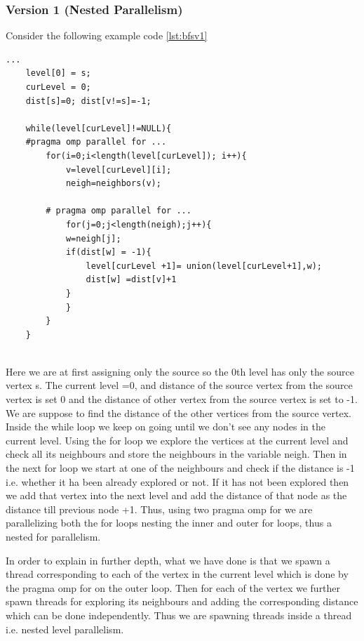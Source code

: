 \documentclass[12pt]{article}
\begin{document}
\subsubsection{Version 1 (Nested Parallelism)}
Consider the following example code \ref{lst:bfsv1}
\begin{lstlisting}[caption={BFS-Example},captionpos=b,label={lst:bfsv1}]
...
    level[0] = s;
    curLevel = 0;
    dist[s]=0; dist[v!=s]=-1;

    while(level[curLevel]!=NULL){
    #pragma omp parallel for ...
        for(i=0;i<length(level[curLevel]); i++){
            v=level[curLevel][i];
            neigh=neighbors(v);

        # pragma omp parallel for ...
            for(j=0;j<length(neigh);j++){
            w=neigh[j];
            if(dist[w] = -1){
                level[curLevel +1]= union(level[curLevel+1],w);
                dist[w] =dist[v]+1
            }
            }
        }
    }
    
\end{lstlisting}
Here we are at first assigning only the source so the 0th level has only the source vertex s. The current level =0, and distance of the source vertex from the source vertex is set 0 and the distance of other vertex from the source vertex is set to -1. We are suppose to find the distance of the other vertices from the source vertex. 
Inside the while loop we keep on going until we don't see any nodes in the current level. Using the for loop we explore the vertices at the current level and check all its neighbours and store the neighbours in the variable neigh. Then in the next for loop we start at one of the neighbours and check if the distance is -1 i.e. whether it ha been already explored or not. If it has not been explored then we add that vertex into the next level and add the distance of that node as the distance till previous node +1. Thus, using two pragma omp for we are parallelizing both the for loops nesting the inner and outer for loops, thus a nested for parallelism.

In order to explain in further depth, what we have done is that we spawn a thread corresponding to each of the vertex in the current level which is done by the pragma omp for on the outer loop. Then for each of the vertex we further spawn threads for exploring its neighbours and adding the corresponding distance which can be done independently. Thus we are spawning threads inside a thread i.e. nested level parallelism.
\end{document}

